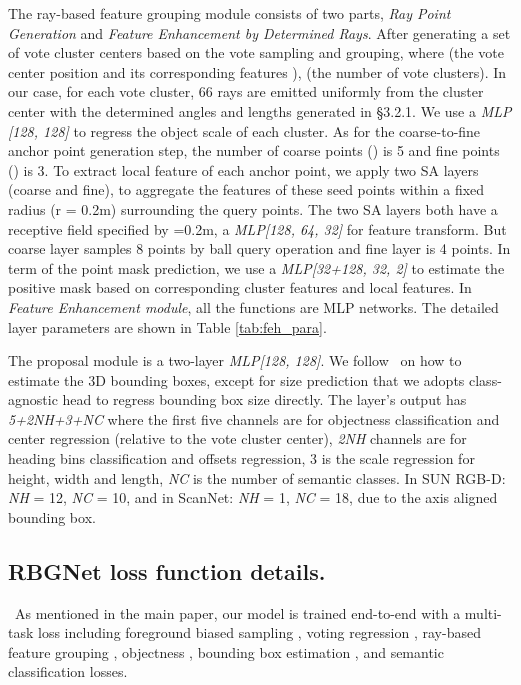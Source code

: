 \documentclass[final]{cvpr}
\begin{document}
The ray-based feature grouping module consists of two parts, \textit{Ray Point Generation} and \textit{Feature Enhancement by Determined Rays}. After generating a set of vote cluster centers  based on the vote sampling and grouping, where  (the vote center position  and its corresponding features ),  (the number of vote clusters). 
In our case, for each vote cluster, 66 rays are emitted uniformly from the cluster center with the determined angles and lengths generated in \S{\color{red}3.2.1}. We use a \textit{MLP [128, 128]} to regress the object scale of each cluster. 
As for the coarse-to-fine anchor point generation step, the number of coarse points () is 5 and fine points () is 3. To extract local feature of each anchor point, we apply two SA layers (coarse and fine), to aggregate the features of these seed points within a fixed radius (r = 0.2m) surrounding the query points. The two SA layers both have a receptive field specified by =0.2m, a \textit{MLP[128, 64, 32]} for feature transform. But coarse layer samples 8 points by ball query operation and fine layer is 4 points. 
In term of the point mask prediction, we use a \textit{MLP[32+128, 32, 2]} to estimate the positive mask based on corresponding cluster features and local features. In \textit{Feature Enhancement module}, all the functions  are MLP networks. The detailed layer parameters are shown in Table \ref{tab:feh_para}.


The proposal module is a two-layer \textit{MLP[128, 128]}. We follow~\cite{qi2019deep} on how to estimate the 3D bounding boxes, except for size prediction that we adopts class-agnostic head to regress bounding box size directly. The layer’s output has \textit{5+2NH+3+NC} where the first five channels are for objectness classification and center regression (relative to the vote cluster center), \textit{2NH} channels are for heading bins classification and offsets regression, 3 is the scale regression for height, width and length, \textit{NC} is the number of semantic classes. In SUN RGB-D: \textit{NH} = 12, \textit{NC} = 10, and in ScanNet: \textit{NH} = 1, \textit{NC} = 18, due to the axis aligned bounding box. 

\subsection{RBGNet loss function details.}~As mentioned in the main paper, our model is trained end-to-end with a multi-task loss including foreground biased sampling , voting regression , ray-based feature grouping , objectness , bounding box estimation , and semantic classification  losses.
\end{document}
